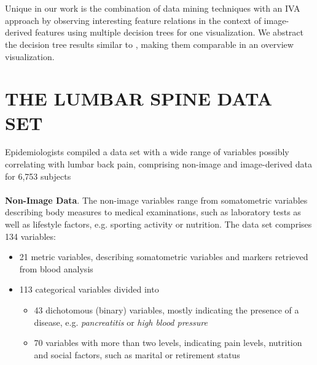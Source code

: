 \documentclass[a4paper,twoside]{style/article}
\begin{document}
\\\\
Unique in our work is the combination of data mining techniques with an IVA approach by observing interesting feature relations in the context of image-derived features using multiple decision trees for one visualization.
We abstract the decision tree results similar to \cite{Turkay}, making them comparable in an overview visualization.
\section{\uppercase{The Lumbar Spine Data Set}}
\label{sec:MaterialsAndMethod}
\noindent Epidemiologists compiled a data set with a wide range of variables possibly correlating with lumbar back pain, comprising non-image and image-derived data for 6,753 subjects
\\\\
\noindent \textbf{Non-Image Data}.
The non-image variables range from somatometric variables describing body measures to medical examinations, such as laboratory tests as well as lifestyle factors, e.g. sporting activity or nutrition.
The data set comprises 134 variables: %
\begin{itemize}
	\item 21 metric variables, describing somatometric variables and markers retrieved from blood analysis
	\item 113 categorical variables divided into
	\begin{itemize}
		\item 43 dichotomous (binary) variables, mostly indicating the presence of a disease, e.g. \emph{pancreatitis} or \emph{high blood pressure}
		\item 70 variables with more than two levels, indicating pain levels, nutrition and social factors, such as marital or retirement status
	\end{itemize}
\end{itemize}
\end{document}

